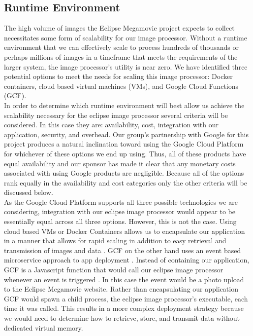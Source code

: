 \documentclass[10pt, onecolumn, draftclsnofoot, letterpaper, compsoc]{IEEEtran}
\begin{document}
\subsection{Runtime Environment}

The high volume of images the Eclipse Megamovie project expects to collect
necessitates some form of scalability for our image processor. Without a runtime
environment that we can effectively scale to process hundreds of thousands or
perhaps millions of images in a timeframe that meets the requirements of the
larger system, the image processor's utility is near zero. We have identified
three potential options to meet the needs for scaling this image processor:
Docker containers, cloud based virtual machines (VMs), and Google Cloud
Functions (GCF).\\

In order to determine which runtime environment will best allow us achieve the
scalability necessary for the eclipse image processor several criteria will be
considered. In this case they are: availability, cost, integration with our
application, security, and overhead. Our group's partnership with Google for
this project produces a natural inclination toward using the Google Cloud
Platform for whichever of these options we end up using. Thus, all of these
products have equal availability and our sponsor has made it clear that any
monetary costs associated with using Google products are negligible. Because all
of the options rank equally in the availability and cost categories only the
other criteria will be discussed below. \\

As the Google Cloud Platform supports all three possible technologies we are
considering, integration with our eclipse image processor would appear to be
essentially equal across all three options. However, this is not the case. Using
cloud based VMs or Docker Containers allows us to encapsulate our application
in a manner that allows for rapid scaling in addition to easy retrieval and
transmission of images and data \cite{docker, gcp}. GCF on the other hand uses
an event based microservice approach to app deployment \cite{gcp}. Instead of
containing our application, GCF is a Javascript function that would call our
eclipse image processor whenever an event is triggered \cite{gcp}. In this case
the event would be a photo upload to the Eclipse Megamovie website. Rather than
encapsulating our application GCF would spawn a child process, the eclipse image
processor's executable, each time it was called. This results in a more complex
deployment strategy because we would need to determine how to retrieve, store,
and transmit data without dedicated virtual memory. \\
\end{document}

